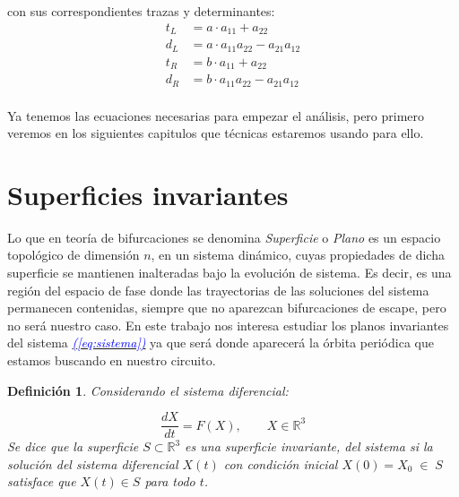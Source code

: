 \documentclass[12pt,a4paper]{report} %
\newtheorem{definicion}{Definición} %
\newcommand{\eref}[1]{\hyperref[#1]{\textcolor{blue}{\textit{(\ref*{#1})}}}}
\begin{document}
    con sus correspondientes trazas y determinantes:
    \begin{equation}
    \begin{aligned}
    	t_L &= a \cdot a_{11} + a_{22}\\
    	d_L &= a \cdot a_{11}a_{22} - a_{21}a_{12}\\
    	t_R &= b \cdot a_{11} + a_{22}\\
    	d_R &= b \cdot a_{11}a_{22} - a_{21}a_{12}\\
    \end{aligned}
    \end{equation}\smallskip
    
	Ya tenemos las ecuaciones necesarias para empezar el análisis, pero primero veremos en los siguientes capitulos que técnicas estaremos usando para ello.
	\newpage
	\section{Superficies invariantes}
	\noindent Lo que en teoría de bifurcaciones se denomina \textit{Superficie} o \textit{Plano} es un espacio topológico de dimensión $n$, en un sistema dinámico, cuyas propiedades de dicha superficie se mantienen inalteradas bajo la evolución de sistema. Es decir, es una región del espacio de fase donde las trayectorias de las soluciones del sistema permanecen contenidas, siempre que no aparezcan bifurcaciones de escape, pero no será nuestro caso. En este trabajo nos interesa estudiar los planos invariantes del sistema \eref{eq:sistema} ya que será donde aparecerá la órbita periódica que estamos buscando en nuestro circuito.
	
	\begin{definicion}
		Considerando el sistema diferencial:
		
		\begin{equation}
			\frac{dX}{dt}=F(X),\qquad X\in \mathbb{R}^3
		\end{equation}\smallskip
		Se dice que la superficie $S\subset \mathbb{R}^3$ es una superficie invariante, del sistema si la solución del sistema diferencial $X(t)$ con condición inicial $X(0)=X_0\; \in \; S$ satisface que $X(t) \in S$ para todo $t$.
	\end{definicion}
	
\end{document}

